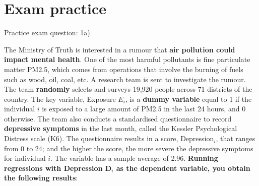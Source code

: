 \documentclass[11pt]{beamer}
\begin{document}
\section{Exam practice}

\begin{frame}{Practice exam question: 1a)}

   \small{The Ministry of Truth is interested in a rumour that \textbf{air pollution could impact mental health}. One of the most harmful pollutants is fine particulate matter PM2.5, which comes from operations that involve the burning of fuels such as wood, oil, coal, etc. A research team is sent to investigate the rumour. The team \textbf{randomly} selects and surveys 19,920 people across 71 districts of the country. The key variable, Exposure $E_i$, is a \textbf{dummy variable} equal to 1 if the individual $i$ is exposed to a large amount of PM2.5 in the last 24 hours, and 0 otherwise. The team also conducts a standardised questionnaire to record \textbf{depressive symptoms} in the last month, called the Kessler Psychological Distress scale (K6). The questionnaire results in a score, Depression$_i$, that ranges from 0 to 24; and the higher the score, the more severe the depressive symptoms for individual $i$. The variable has a sample average of 2.96. \textbf{Running regressions with Depression D$_i$ as  the dependent variable, you obtain the following results}:
}
    
\end{frame}
\end{document}
